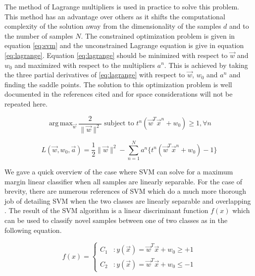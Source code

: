\documentclass[journal]{IEEEtran}
\DeclareMathOperator*{\argmax}{arg\,max}
\begin{document}
\par The method of Lagrange multipliers is used in practice to solve this problem. This method has an advantage over others as it shifts the computational complexity of the solution away from the dimensionality of the samples \(d\) and to the number of samples \(N\). The constrained optimization problem is given in equation \ref{eq:svm} and the unconstrained Lagrange equation is give in equation \ref{eq:lagrange}. Equation \ref{eq:lagrange} should be minimized with respect to \(\vec{w}\) and \(w_0\) and maximized with respect to the multipliers \(a^n\). This is achieved by taking the three partial derivatives of \ref{eq:lagrange} with respect to \(\vec{w}\), \(w_0\) and \(a^n\) and finding the saddle points. The solution to this optimization problem is well documented in the references cited and for space considerations will not be repeated here.

\begin{equation}
\label{eq:svm}
\argmax_{\vec{w}}\frac{2}{\|\vec{w}\|^2} \text{  subject to  } t^n(\vec{w}^T\vec{x}^n+w_0) \ge 1, \forall n
\end{equation}

\begin{equation}
\label{eq:lagrange}
L(\vec{w}, w_0, \vec{a}) = \frac{1}{2}\|\vec{w}\|^2 - \sum_{n=1}^{N}{a^n\{t^n(\vec{w}^T\vec{x}^n + w_0) - 1\}}
\end{equation}

\par We gave a quick overview of the case where SVM can solve for a maximum margin linear classifier when all samples are linearly separable. For the case of brevity, there are numerous references of SVM which do a much more thorough job of detailing SVM when the two classes are linearly separable and overlapping \cite[p.~218-223]{alpaydin}\cite[p.~325-356]{bishop2}\cite[p.259-265]{duda}. The result of the SVM algorithm is a linear discriminant function \(f(x)\) which can be used to classify novel samples between one of two classes as in the following equation.

\begin{displaymath}
\label{eq:decision}
f(x) = \left\{
    \begin{array}{lr}
      C_1 & : y(\vec{x}) = \vec{w}^T\vec{x} + w_0 \ge +1 \\
      C_2 & : y(\vec{x}) = \vec{w}^T\vec{x} + w_0 \le -1
    \end{array}
  \right.
\end{displaymath}
\end{document}
